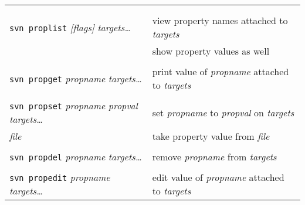 \documentclass{report}
\begin{document}
\begin{tabular}{ll}
\\
\\
\vspace{0.1in} \hspace{-0.1in}{\bf\Large Metadata}  \\

{\tt svn proplist} {\sl [flags]} {\sl targets\dots}    &
view property names attached to {\sl targets}     \\

\hspace{0.5in}{\tt -v}		&
show property values as well	 \\

\\
{\tt svn propget} {\sl propname} {\sl targets\dots}    &
print value of {\sl propname} attached to {\sl targets}     \\

\\
{\tt svn propset} {\sl propname} {\sl propval} {\sl targets\dots}    &
set {\sl propname} to {\sl propval} on {\sl targets}     \\

\hspace{0.5in}{\tt -F} {\sl file}		&
take property value from {\sl file}	 \\

\\
{\tt svn propdel} {\sl propname} {\sl targets\dots}    &
remove {\sl propname} from {\sl targets}     \\

\\
{\tt svn propedit} {\sl propname} {\sl targets\dots}    &
edit value of {\sl propname} attached to {\sl targets}     \\



\end{tabular}
\end{document}
